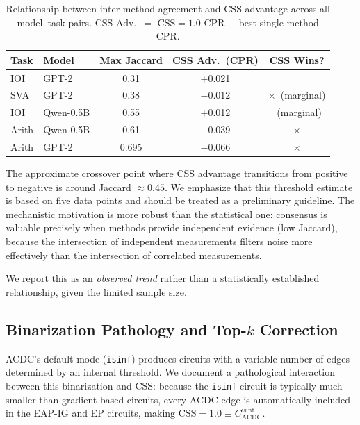 \documentclass[11pt,a4paper]{article}
\newcommand{\css}{\textsc{CSS}}
\newcommand{\cmark}{\checkmark}
\newcommand{\xmark}{$\times$}
\begin{document}
\begin{table}[t]
\centering
\small
\caption{Relationship between inter-method agreement and \css{} advantage across all model--task pairs. CSS Adv.\ $=$ \css{}$=1.0$ CPR $-$ best single-method CPR.}
\label{tab:correlation}
\begin{tabular}{@{}llccc@{}}
\toprule
Task & Model & Max Jaccard & CSS Adv.\ (CPR) & CSS Wins? \\
\midrule
IOI & GPT-2 & 0.31 & $+$0.021 & \cmark \\
SVA & GPT-2 & 0.38 & $-$0.012 & \xmark\ (marginal) \\
IOI & Qwen-0.5B & 0.55 & $+$0.012 & \cmark\ (marginal) \\
Arith & Qwen-0.5B & 0.61 & $-$0.039 & \xmark \\
Arith & GPT-2 & 0.695 & $-$0.066 & \xmark \\
\bottomrule
\end{tabular}
\end{table}

The approximate crossover point where \css{} advantage transitions from positive to negative is around Jaccard $\approx 0.45$.
We emphasize that this threshold estimate is based on five data points and should be treated as a preliminary guideline.
The mechanistic motivation is more robust than the statistical one: consensus is valuable precisely when methods provide independent evidence (low Jaccard), because the intersection of independent measurements filters noise more effectively than the intersection of correlated measurements.

We report this as an \emph{observed trend} rather than a statistically established relationship, given the limited sample size.

\subsection{Binarization Pathology and Top-$k$ Correction}
\label{sec:binarization}

ACDC's default mode (\texttt{isinf}) produces circuits with a variable number of edges determined by an internal threshold.
We document a pathological interaction between this binarization and \css{}: because the \texttt{isinf} circuit is typically much smaller than gradient-based circuits, every ACDC edge is automatically included in the EAP-IG and EP circuits, making \css{}$=1.0 \equiv C_{\text{ACDC}}^{\text{isinf}}$.
\end{document}
